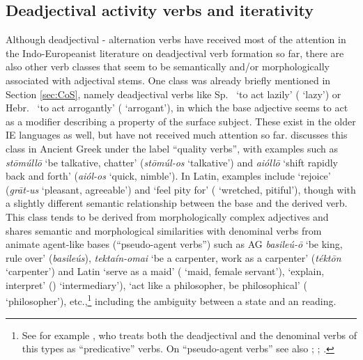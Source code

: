 \documentclass[output=paper,colorlinks,citecolor=brown]{langscibook}
\begin{document}
\subsection{Deadjectival activity verbs and iterativity}
\label{sec:iter}

Although deadjectival - alternation verbs have received most of the attention in the Indo-Europeanist literature on deadjectival verb formation so far, there are also other verb classes that seem to be semantically and/or morphologically associated with adjectival stems. One class was already briefly mentioned in Section \ref{sec:CoS}, namely deadjectival  verbs  like Sp.\  `to act lazily' ( `lazy') or Hebr.\   `to act arrogantly' (  `arrogant'), in which the base adjective seems to act as a modifier describing a property of the surface subject. These exist in the older IE languages as well, but have not received much attention so far. \citet{Marescotti2024} discusses this class in Ancient Greek  under the label ``quality verbs'', with examples such as \textit{stōmúllō} `be talkative, chatter' (\textit{stōmúl-os}  `talkative') and \textit{aióllō} `shift rapidly back and forth' (\textit{aiól-os}  `quick, nimble'). In Latin, examples include  `rejoice' (\textit{grāt-us}  `pleasant, agreeable') and  `feel pity for' ( `wretched, pitiful'), though with a slightly different semantic relationship between the base and the derived verb.  This class tends to be derived from morphologically complex adjectives and shares semantic and morphological similarities with denominal verbs from animate agent-like bases (``pseudo-agent verbs'') such as AG \textit{basileú-ō} `be king, rule over' (\textit{basileús}), \textit{tektaín-omai} `be a carpenter, work as a carpenter' (\textit{téktōn} `carpenter') and Latin  `serve as a maid' ( `maid, female servant'),  `explain, interpret' () `intermediary'),  `act like a philosopher, be philosophical'  ( `philosopher'), etc.,\footnote{See for example \citet[666--674]{Flobert1975}, who treats both the deadjectival  and the denominal verbs of this types as  ``predicative'' verbs. On ``pseudo-agent verbs'' see also \citealt[137--139]{Xu2007}; \citealt[163--168]{Bleotu2019}; \citealt{MarescottiGrestenberger2025}.} including the ambiguity between a state and an  reading.
\end{document}
